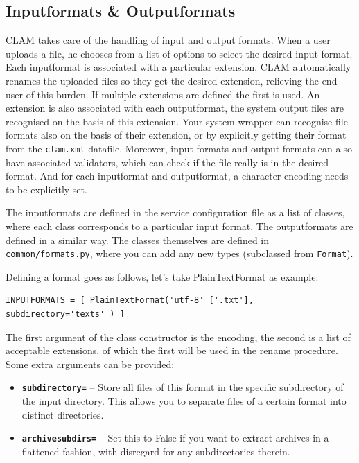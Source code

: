 \documentclass[a4paper,12pt]{report}
\begin{document}
\subsection{Inputformats \& Outputformats}
\label{sec:formats}

CLAM takes care of the handling of input and output formats. When a user uploads a file, he chooses from a list of options to select the desired input format. Each inputformat is associated with a particular extension. CLAM automatically renames the uploaded files so they get the desired extension, relieving the end-user of this burden. If multiple extensions are defined the first is used. An extension is also associated with each outputformat, the system output files are recognised on the basis of this extension. Your system wrapper can recognise file formats also on the basis of their extension, or by explicitly getting their format from the \texttt{clam.xml} datafile. Moreover, input formats and output formats can also have associated validators, which can check if the file really is in the desired format. And for each inputformat and outputformat, a character encoding needs to be explicitly set.

The inputformats are defined in the service configuration file as a list of classes, where each class corresponds to a particular input format. The outputformats are defined in a similar way. The classes themselves are defined in \texttt{common/formats.py}, where you can add any new types (subclassed from \texttt{Format}).

Defining a format goes as follows, let's take PlainTextFormat as example:

\begin{verbatim}
INPUTFORMATS = [ PlainTextFormat('utf-8' ['.txt'], subdirectory='texts' ) ]
\end{verbatim}

The first argument of the class constructor is the encoding, the second is a list of acceptable extensions, of which the first will be used in the rename procedure. Some extra arguments can be provided:

\begin{itemize}
\item \textbf{\texttt{subdirectory=}} -- Store all files of this format in the specific subdirectory of the input directory. This allows you to separate files of a certain format into distinct directories. 
\item \textbf{\texttt{archivesubdirs=}} -- Set this to False if you want to extract archives in a flattened fashion, with disregard for any subdirectories therein.
\end{itemize}
\end{document}
